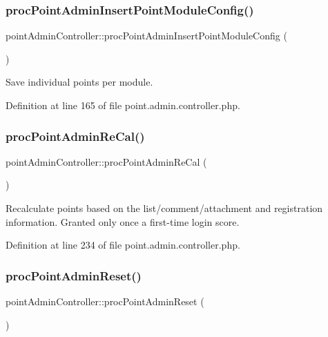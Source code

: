 \subsubsection{\texorpdfstring{proc\+Point\+Admin\+Insert\+Point\+Module\+Config()}{procPointAdminInsertPointModuleConfig()}}
{\footnotesize\ttfamily point\+Admin\+Controller\+::proc\+Point\+Admin\+Insert\+Point\+Module\+Config (\begin{DoxyParamCaption}{ }\end{DoxyParamCaption})}



Save individual points per module. 



Definition at line 165 of file point.\+admin.\+controller.\+php.

\hypertarget{classpointAdminController_a0932223bc8b3441dcfff013c6050ee89}{}\label{classpointAdminController_a0932223bc8b3441dcfff013c6050ee89} 
\subsubsection{\texorpdfstring{proc\+Point\+Admin\+Re\+Cal()}{procPointAdminReCal()}}
{\footnotesize\ttfamily point\+Admin\+Controller\+::proc\+Point\+Admin\+Re\+Cal (\begin{DoxyParamCaption}{ }\end{DoxyParamCaption})}



Recalculate points based on the list/comment/attachment and registration information. Granted only once a first-\/time login score. 



Definition at line 234 of file point.\+admin.\+controller.\+php.

\hypertarget{classpointAdminController_ab5131a2b0dd2fe07086034dceb9ae26f}{}\label{classpointAdminController_ab5131a2b0dd2fe07086034dceb9ae26f} 
\subsubsection{\texorpdfstring{proc\+Point\+Admin\+Reset()}{procPointAdminReset()}}
{\footnotesize\ttfamily point\+Admin\+Controller\+::proc\+Point\+Admin\+Reset (\begin{DoxyParamCaption}{ }\end{DoxyParamCaption})}



